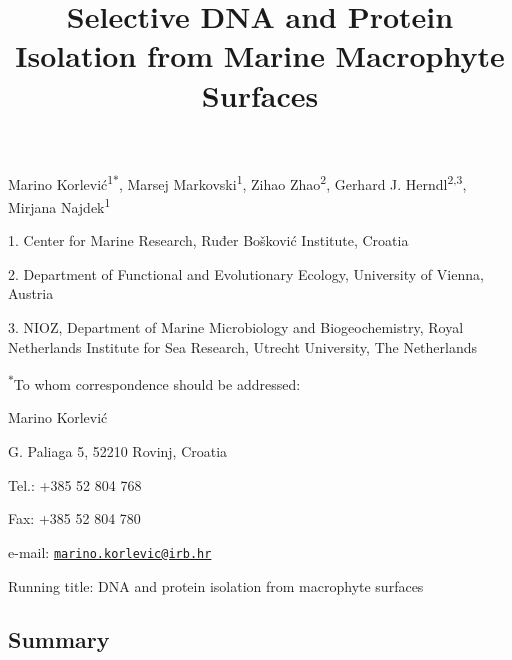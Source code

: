 \documentclass[12pt,]{article}
\title{\textbf{Selective DNA and Protein Isolation from Marine Macrophyte
Surfaces}}
\author{}
\date{}
\begin{document}
\maketitle

\vspace{20mm}

Marino Korlević\textsuperscript{1\(*\)}, Marsej
Markovski\textsuperscript{1}, Zihao Zhao\textsuperscript{2}, Gerhard J.
Herndl\textsuperscript{2,3}, Mirjana Najdek\textsuperscript{1}

1. Center for Marine Research, Ruđer Bošković Institute, Croatia

2. Department of Functional and Evolutionary Ecology, University of
Vienna, Austria

3. NIOZ, Department of Marine Microbiology and Biogeochemistry, Royal
Netherlands Institute for Sea Research, Utrecht University, The
Netherlands

\textsuperscript{\(*\)}To whom correspondence should be addressed:

Marino Korlević

G. Paliaga 5, 52210 Rovinj, Croatia

Tel.: +385 52 804 768

Fax: +385 52 804 780

e-mail:
\href{mailto:marino.korlevic@irb.hr}{\nolinkurl{marino.korlevic@irb.hr}}

Running title: DNA and protein isolation from macrophyte surfaces

\newpage
\linenumbers
{}
\setlength\parindent{24pt}

\hypertarget{summary}{%
\subsection{Summary}\label{summary}}
\end{document}
